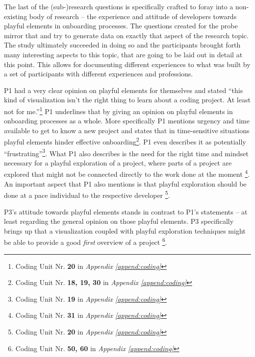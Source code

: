 The last of the (sub-)research questions is specifically crafted to foray into a non-existing body of research -- the experience and attitude of developers towards playful elements in onboarding processes. The questions created for the probe mirror that and try to generate data on exactly that aspect of the research topic. The study ultimately succeeded in doing so and the participants brought forth many interesting aspects to this topic, that are going to be laid out in detail at this point. This allows for documenting different experiences to what was built by a set of participants with different experiences and professions.

P1 had a very clear opinion on playful elements for themselves and stated \enquote{this kind of visualization isn't the right thing to learn about a coding project. At least not for me.}\footnote{Coding Unit Nr. \textbf{20} in \textit{Appendix \ref{append:coding}}} P1 underlines that by giving an opinion on playful elements in onboarding processes as a whole. More specifically P1 mentions urgency and time available to get to know a new project and states that in time-sensitive situations playful elements hinder effective onboarding\footnote{Coding Unit Nr. \textbf{18, 19, 30} in \textit{Appendix \ref{append:coding}}}. P1 even describes it as potentially \enquote{frustrating}\footnote{Coding Unit Nr. \textbf{19} in \textit{Appendix \ref{append:coding}}}. What P1 also describes is the need for the right time and mindset necessary for a playful exploration of a project, where parts of a project are explored that might not be connected directly to the work done at the moment \footnote{Coding Unit Nr. \textbf{31} in \textit{Appendix \ref{append:coding}}}. An important aspect that P1 also mentions is that playful exploration should be done at a pace individual to the respective developer \footnote{Coding Unit Nr. \textbf{20} in \textit{Appendix \ref{append:coding}}}.

P3's attitude towards playful elements stands in contrast to P1's statements -- at least regarding the general opinion on those playful elements. P3 specifically brings up that a visualization coupled with playful exploration techniques might be able to provide a good \textit{first} overview of a project \footnote{Coding Unit Nr. \textbf{50, 60} in \textit{Appendix \ref{append:coding}}}.

